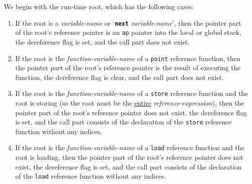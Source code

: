 \documentclass[12pt]{article}
\newcommand{\TT}[1]{{\tt \bfseries #1}}
\begin{document}
We begin with the run-time root, which has the following cases:
\begin{enumerate}
\item If the root is a {\em variable-name} or
`\TT{next} {\em variable-name}', then the pointer part of the root's
reference pointer is
an {\tt ap} pointer into the local or global stack,
the dereference flag is set, and the call part does not exist.
\item If the root is the {\em function-variable-name} of a
{\tt point} reference function, then the pointer part of the root's
reference pointer is the result of executing the function, the
dereference flag is clear, and the call part does not exist.
\item If the root is the {\em function-variable-name} of a
{\tt store} reference function and the root is storing
(so the root must be the \underline{entire} {\em reference-expression}),
then the pointer part of the root's
reference pointer does not exist,
the dereference flag is set, and the call part consists of the
declaration of the {\tt store} reference function without any indices.
\item If the root is the {\em function-variable-name} of a
{\tt load} reference function
and the root is loading,
then the pointer part of the root's
reference pointer does not exist,
the dereference flag is set, and the call part consists of the
declaration of the {\tt load} reference function without any indices.
\end{enumerate}
\end{document}
